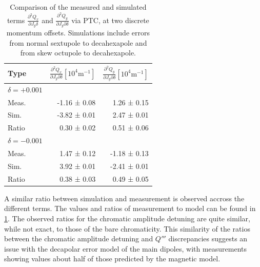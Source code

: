 \begin{table}[H]
  \centering
  \begin{tabular}{lrr}
  \toprule
   Type  & $\frac{\partial^2 Q_x}{\partial J_y \partial \delta}[10^{4}\mathrm{m}^{-1}]$ & $\frac{\partial^2 Q_y}{\partial J_y \partial \delta}[10^{4}\mathrm{m}^{-1}]$ \\
  \midrule
  $\delta = +0.001$ & & \\
  \hspace{2mm}Meas.  &   -1.16 ± 0.08 &   1.26 ± 0.15 \\
  \hspace{2mm}Sim.   &   -3.82 ± 0.01 &   2.47 ± 0.01 \\
  \hspace{2mm}Ratio  &    0.30 ± 0.02 &   0.51 ± 0.06 \\
  $\delta = -0.001$ & & \\
  \hspace{2mm}Meas.  &  1.47 ± 0.12  &  -1.18 ± 0.13 \\
  \hspace{2mm}Sim.   &  3.92 ± 0.01  &  -2.41 ± 0.01 \\
  \hspace{2mm}Ratio  &  0.38 ± 0.03  &   0.49 ± 0.05 \\
  \bottomrule
  \end{tabular}
  \caption{Comparison of the measured and simulated terms $\frac{\partial^2 Q_x}{\partial J_y
   \delta}$ and $\frac{\partial^2 Q_y}{\partial J_y \partial \delta}$ via PTC, at two
  discrete momentum offsets. Simulations include errors from normal sextupole to decahexapole and
  from skew octupole to decahexapole.}
  \label{table:decapoles:chromatic_ampdet}
\end{table}


A similar ratio between simulation and measurement is observed accross the different terms. The
values and ratios of measurement to model can be found in \cref{table:decapoles:chromatic_ampdet}.
The observed ratios for the chromatic amplitude detuning are quite similar, while not exact,
to those of the bare chromaticity.
This similarity of the ratios between the chromatic amplitude detuning and $Q'''$ discrepancies
suggests an issue with the decapolar error model of the main dipoles, with measurements showing
values about half of those predicted by the magnetic model.
